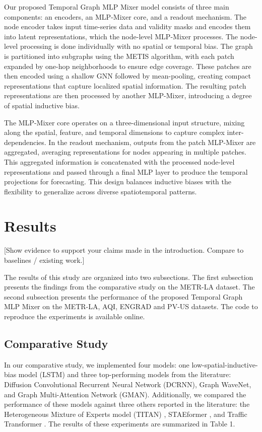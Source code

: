 \documentclass{article}
\theoremstyle{plain}
\theoremstyle{definition}
\theoremstyle{remark}
\begin{document}
Our proposed Temporal Graph MLP Mixer model consists of three main components: an encoders, an MLP-Mixer core, and a readout mechanism. The node encoder takes input time-series data and validity masks and encodes them into latent representations, which the node-level MLP-Mixer processes. The node-level processing is done individually with no spatial or temporal bias. The graph is partitioned into subgraphs using the METIS algorithm, with each patch expanded by one-hop neighborhoods to ensure edge coverage. These patches are then encoded using a shallow GNN followed by mean-pooling, creating compact representations that capture localized spatial information. The resulting patch representations are then processed by another MLP-Mixer, introducing a degree of spatial inductive bias.

The MLP-Mixer core operates on a three-dimensional input structure, mixing along the spatial, feature, and temporal dimensions to capture complex inter-dependencies. In the readout mechanism, outputs from the patch MLP-Mixer are aggregated, averaging representations for nodes appearing in multiple patches. This aggregated information is concatenated with the processed node-level representations and passed through a final MLP layer to produce the temporal projections for forecasting. This design balances inductive biases with the flexibility to generalize across diverse spatiotemporal patterns.

\section{Results}

[Show evidence to support your claims made in the introduction. Compare to baselines / existing work.]

The results of this study are organized into two subsections. The first subsection presents the findings from the comparative study on the METR-LA dataset. The second subsection presents the performance of the proposed Temporal Graph MLP Mixer on the METR-LA, AQI, ENGRAD and PV-US datasets. The code to reproduce the experiments is available online. 

\subsection{Comparative Study}
In our comparative study, we implemented four models: one low-spatial-inductive-bias model (LSTM) and three top-performing models from the literature: Diffusion Convolutional Recurrent Neural Network (DCRNN), Graph WaveNet, and Graph Multi-Attention Network (GMAN). Additionally, we compared the performance of these models against three others reported in the literature: the Heterogeneous Mixture of Experts model (TITAN) \cite{wang2024mixturemodel}, STAEformer \cite{liu2023vanillatransformer}, and Traffic Transformer \cite{cai2020traffictransformer}. The results of these experiments are summarized in Table 1.
\end{document}
